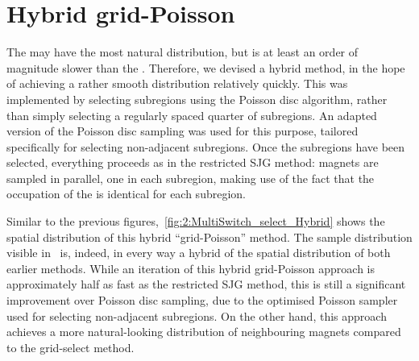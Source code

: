\section{Hybrid grid-Poisson}
The  may have the most natural distribution, but is at least an order of magnitude slower than the .
Therefore, we devised a hybrid method, in the hope of achieving a rather smooth distribution relatively quickly.
This was implemented by selecting subregions using the Poisson disc algorithm, rather than simply selecting a regularly spaced quarter of subregions.
An adapted version of the Poisson disc sampling was used for this purpose, tailored specifically for selecting non-adjacent subregions.
Once the subregions have been selected, everything proceeds as in the restricted SJG method: magnets are sampled in parallel, one in each subregion, making use of the fact that the occupation of the  is identical for each subregion. \\\par
Similar to the previous figures,~\cref{fig:2:MultiSwitch_select_Hybrid} shows the spatial distribution of this hybrid ``grid-Poisson'' method.
The sample distribution visible in~ is, indeed, in every way a hybrid of the spatial distribution of both earlier methods.
While an iteration of this hybrid grid-Poisson approach is approximately half as fast as the restricted SJG method, this is still a significant improvement over Poisson disc sampling, due to the optimised Poisson sampler used for selecting non-adjacent subregions.
On the other hand, this approach achieves a more natural-looking distribution of neighbouring magnets compared to the grid-select method.

\vspace{-1em}

